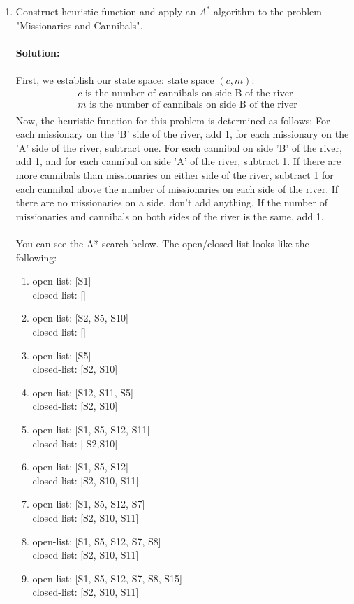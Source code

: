 \documentclass[11pt]{article}
\begin{document}
\vspace{.25cm}
\begin{enumerate}
\item Construct heuristic function and apply an $A^*$ algorithm to the problem "Missionaries and Cannibals".\\\\
\textbf{Solution:}\\\\
First, we establish our state space: 
state space $(c, m)$:
\begin{align*}
&c\text{ is the number of cannibals on side B of the river}\\
&m \text{ is the number of cannibals on side B of the river}\\
\end{align*}
Now, the heuristic function for this problem is determined as follows: For each missionary on the 'B' side of the river, add 1, for each missionary on the 'A' side of the river, subtract one. For each cannibal on side 'B' of the river, add 1, and for each cannibal on side 'A' of the river, subtract 1. If there are more cannibals than missionaries on either side of the river, subtract 1 for each cannibal above the number of missionaries on each side of the river. If there are no missionaries on a side, don't add anything. If the number of missionaries and cannibals on both sides of the river is the same, add 1. \\\\
You can see the A* search below. The open/closed list looks like the following: 
\begin{enumerate}
\item open-list: [S1]\\
closed-list: []
\item open-list: [S2, S5, S10]\\
closed-list: []
\item open-list: [S5]\\
closed-list: [S2, S10]
\item open-list: [S12, S11, S5]\\
closed-list: [S2, S10]
\item open-list: [S1, S5, S12, S11]\\
closed-list: [ S2,S10]
\item open-list: [S1, S5, S12]\\
closed-list: [S2, S10, S11]
\item open-list: [S1, S5, S12, S7]\\
closed-list: [S2, S10, S11]
\item open-list: [S1, S5, S12, S7, S8]\\
closed-list: [S2, S10, S11]
\item open-list: [S1, S5, S12, S7, S8, S15]\\
closed-list: [S2, S10, S11]
\end{enumerate}



\end{enumerate}
\end{document}
